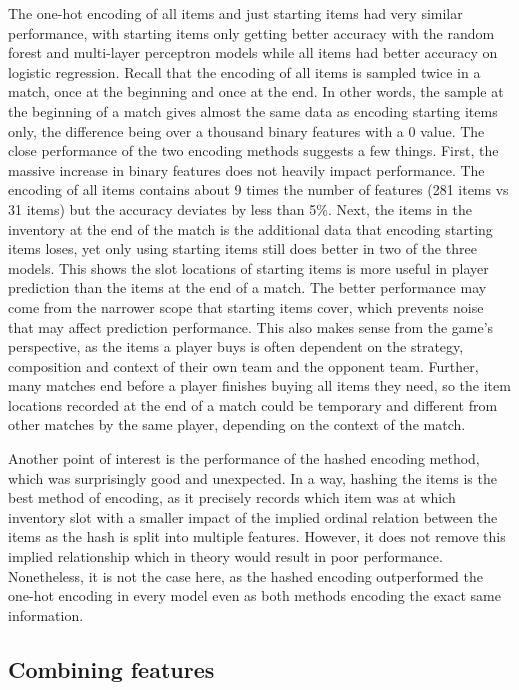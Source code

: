 \documentclass[Report.tex]{subfiles}
\begin{document}
The one-hot encoding of all items and just starting items had very similar performance, with starting items only getting better accuracy with the random forest and multi-layer perceptron models while all items had better accuracy on logistic regression. Recall that the encoding of all items is sampled twice in a match, once at the beginning and once at the end. In other words, the sample at the beginning of a match gives almost the same data as encoding starting items only, the difference being over a thousand binary features with a 0 value. The close performance of the two encoding methods suggests a few things. First, the massive increase in binary features does not heavily impact performance. The encoding of all items contains about 9 times the number of features (281 items vs 31 items) but the accuracy deviates by less than 5\%. Next, the items in the inventory at the end of the match is the additional data that encoding starting items loses, yet only using starting items still does better in two of the three models. This shows the slot locations of starting items is more useful in player prediction than the items at the end of a match. The better performance may come from the narrower scope that starting items cover, which prevents noise that may affect prediction performance. This also makes sense from the game's perspective, as the items a player buys is often dependent on the strategy, composition and context of their own team and the opponent team. Further, many matches end before a player finishes buying all items they need, so the item locations recorded at the end of a match could be temporary and different from other matches by the same player, depending on the context of the match. 

Another point of interest is the performance of the hashed encoding method, which was surprisingly good and unexpected. In a way, hashing the items is the best method of encoding, as it precisely records which item was at which inventory slot with a smaller impact of the implied ordinal relation between the items as the hash is split into multiple features. However, it does not remove this implied relationship which in theory would result in poor performance. Nonetheless, it is not the case here, as the hashed encoding outperformed the one-hot encoding in every model even as both methods encoding the exact same information. 

\subsection{Combining features}
\end{document}
